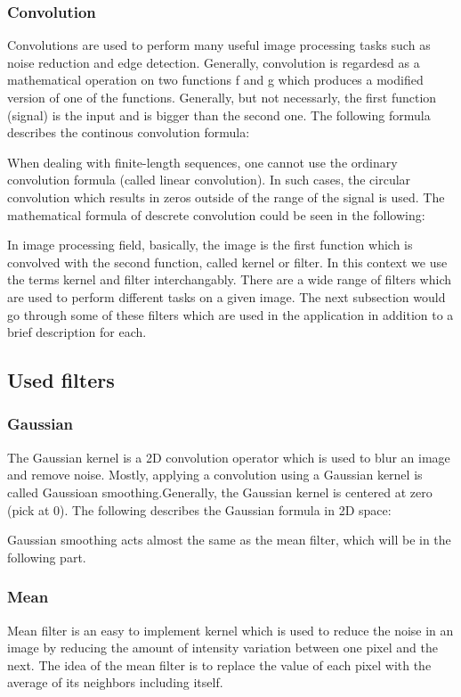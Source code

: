\documentclass{report}
\begin{document}
		\subsubsection{Convolution}

			Convolutions are used to perform many useful image processing tasks such as noise reduction and edge detection. Generally,
			convolution is regardesd as a mathematical operation on two functions f and g which produces a modified version of one of the functions.
			Generally, but not necessarly, the first function (signal) is the input and is bigger than the second one.
			The following formula describes the continous convolution formula:
			
			
			When dealing with finite-length sequences, one cannot use the ordinary convolution formula (called linear convolution).
			In such cases, the circular convolution which results in zeros outside of the range of the signal is used. The mathematical formula of descrete 
			convolution could be seen in the following:
			
			In image processing field, basically, the image is the first function which is convolved with the second function, called kernel or filter.
			In this context we use the terms kernel and filter interchangably.
			There are a wide range of filters which are used to perform different tasks on a given image. The next subsection would go through some of these 
			filters which are used in the application in addition to a brief description for each.

		\subsection{Used filters}
		
		\subsubsection{Gaussian}

			The Gaussian kernel is a 2D convolution operator which is used to blur an image and remove noise. Mostly, applying a convolution using a Gaussian
			kernel is called Gaussioan smoothing.Generally, the Gaussian kernel is centered at
			zero (pick at 0). The following describes the Gaussian formula in 2D space:
			
			Gaussian smoothing acts almost the same as the mean filter, which will be in the following part.
		\subsubsection{Mean}
			Mean filter is an easy to implement kernel which is used to reduce the noise in an image by reducing the amount of intensity variation between one
			pixel and the next. The idea of the mean filter is to replace the value of each pixel with the average of its neighbors including itself. 
			
\end{document}
